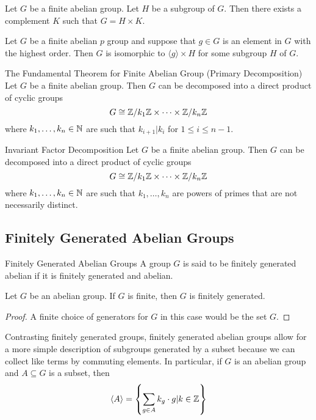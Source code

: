 \documentclass[a4paper]{article}
\begin{document}
\begin{lmm}{}{} Let $G$ be a finite abelian group. Let $H$ be a subgroup of $G$. Then there exists a complement $K$ such that $G=H\times K$. 
\end{lmm}

\begin{lmm}{}{} Let $G$ be a finite abelian $p$ group and suppose that $g\in G$ is an element in $G$ with the highest order. Then $G$ is isomorphic to $\langle g\rangle\times H$ for some subgroup $H$ of $G$. 
\end{lmm}

\begin{thm}{The Fundamental Theorem for Finite Abelian Group (Primary Decomposition)}{} Let $G$ be a finite abelian group. Then $G$ can be decomposed into a direct product of cyclic groups $$G\cong\mathbb{Z}/k_1\mathbb{Z}\times\dots\times\mathbb{Z}/k_n\mathbb{Z}$$ where $k_1,\dots,k_n\in\mathbb{N}$ are such that $k_{i+1}|k_i$ for $1\leq i\leq n-1$. 
\end{thm}

\begin{thm}{Invariant Factor Decomposition}{} Let $G$ be a finite abelian group. Then $G$ can be decomposed into a direct product of cyclic groups $$G\cong\mathbb{Z}/k_1\mathbb{Z}\times\dots\times\mathbb{Z}/k_n\mathbb{Z}$$ where $k_1,\dots,k_n\in\mathbb{N}$ are such that $k_1,\dots,k_n$ are powers of primes that are not necessarily distinct. 
\end{thm}

\subsection{Finitely Generated Abelian Groups}
\begin{defn}{Finitely Generated Abelian Groups}{} A group $G$ is said to be finitely generated abelian if it is finitely generated and abelian. 
\end{defn}

\begin{lmm}{}{} Let $G$ be an abelian group. If $G$ is finite, then $G$ is finitely generated. \tcbline
\begin{proof}
A finite choice of generators for $G$ in this case would be the set $G$. 
\end{proof}
\end{lmm}

Contrasting finitely generated groups, finitely generated abelian groups allow for a more simple description of subgroups generated by a subset because we can collect like terms by commuting elements. In particular, if $G$ is an abelian group and $A\subseteq G$ is a subset, then $$\langle A\rangle=\left\{\sum_{g\in A}k_g\cdot g|k\in\mathbb{Z}\right\}$$
\end{document}
